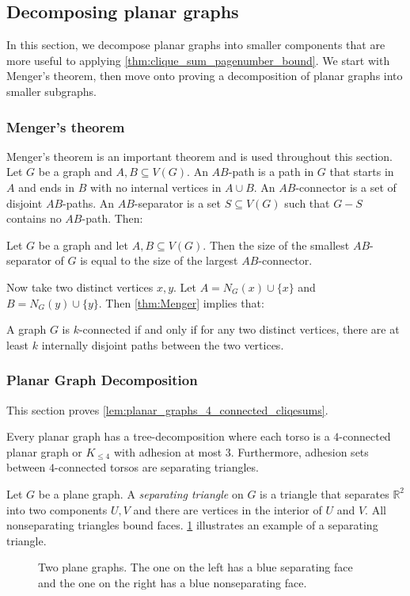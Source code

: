 \subsection{Decomposing planar graphs}
In this section, we decompose planar graphs into smaller components that are more useful to applying \cref{thm:clique_sum_pagenumber_bound}. We start with Menger's theorem, then move onto proving a decomposition of planar graphs into smaller subgraphs. 

\subsubsection{Menger's theorem}

Menger's theorem \cite{mengerZurAllgemeinenKurventheorie1927} is an important theorem and is used throughout this section. 
Let \(G\) be a graph and \(A, B \subseteq V(G)\). An \(AB\)-path is a path in \(G\) that starts in \(A\) and ends in \(B\) with no internal vertices in \(A \cup B\). An \(AB\)-connector is a set of disjoint \(AB\)-paths. An \(AB\)-separator is a set \(S \subseteq V(G)\) such that \(G - S\) contains no \(AB\)-path. Then:
\begin{theorem}\label{thm:Menger}
	Let $G$ be a graph and let $A, B \subseteq V(G)$. Then the size of the smallest \(AB\)-separator of \(G\) is equal to the size of the largest \(AB\)-connector.
\end{theorem}
Now take two distinct vertices \(x, y\). Let \(A = N_G(x) \cup \{x\} \) and \(B = N_G(y) \cup \{y\} \). Then \cref{thm:Menger} implies that:
\begin{theorem}\label{thm:Menger_Vertex}
	A graph \(G\) is \(k\)-connected if and only if for any two distinct vertices, there are at least \(k\) internally disjoint paths between the two vertices.
\end{theorem}

\subsubsection{Planar Graph Decomposition}
This section proves \cref{lem:planar_graphs_4_connected_cliqesums}.
\begin{proposition}\label{lem:planar_graphs_4_connected_cliqesums}
	Every planar graph has a tree-decomposition where each torso is a \(4\)-connected planar graph or $K_{\leq 4}$ with adhesion at most \(3\). Furthermore, adhesion sets between $4$-connected torsos are separating triangles.
\end{proposition}
Let $G$ be a plane graph. A \textit{separating triangle} on $G$ is a triangle that separates $\mathbb{R}^2$ into two components $U, V$ and there are vertices in the interior of $U$ and $V$. All nonseparating triangles bound faces. \cref{fig:separating_triangle} illustrates an example of a separating triangle. 
\begin{figure}[h!]
	
	\caption[Separating faces]{Two plane graphs. The one on the left has a blue separating face and the one on the right has a blue nonseparating face.}
	\label{fig:separating_triangle}
\end{figure}


